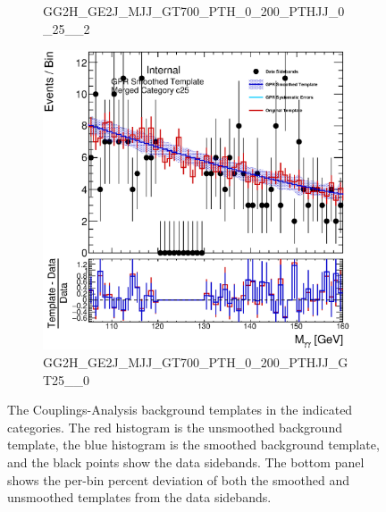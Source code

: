 \begin{figure}
\begin{center}
\begin{subfigure}[T]{0.49\linewidth}
	\caption{\tiny{GG2H\_GE2J\_MJJ\_GT700\_PTH\_0\_200\_PTHJJ\_0\_25\_\_2}}
\end{subfigure}
\begin{subfigure}[T]{0.49\linewidth}
	\centering
	\includegraphics[width=\linewidth]{figures/background/gpr/coupCatTemplates/GPR_Smoothed_Plot_hmgg_c25.eps}
	\caption{\tiny{GG2H\_GE2J\_MJJ\_GT700\_PTH\_0\_200\_PTHJJ\_GT25\_\_0}}
\end{subfigure}
\caption{The Couplings-Analysis background templates in the indicated categories. The red histogram is the unsmoothed background template, the blue histogram is the smoothed background template, and the black points show the data sidebands. The bottom panel shows the per-bin percent deviation of both the smoothed and unsmoothed templates from the data sidebands. }
\label{fig:gpr_coupcat_6}
\end{center}
\end{figure}

